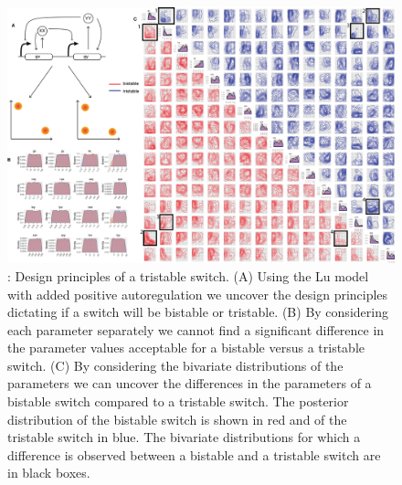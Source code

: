 \begin{figure}[h]
\begin{center}
\includegraphics[width=\textwidth]{chapterStabilityFinder/images/figure-06-alt.png}
\caption[LoF caption]{ \label{fig:fig6}: Design principles of a tristable switch. (A) Using the Lu model with added positive autoregulation we uncover the design principles dictating if a switch will be bistable or tristable. (B) By considering each parameter separately we cannot find a significant difference in the parameter values acceptable for a bistable versus a tristable switch. (C) By considering the bivariate distributions of the parameters we can uncover the differences in the parameters of a bistable switch compared to a tristable switch. The posterior distribution of the bistable switch is shown in red and of the tristable switch in blue. The bivariate distributions for which a difference is observed between a bistable and a tristable switch are in black boxes. }
\end{center}
\end{figure}


